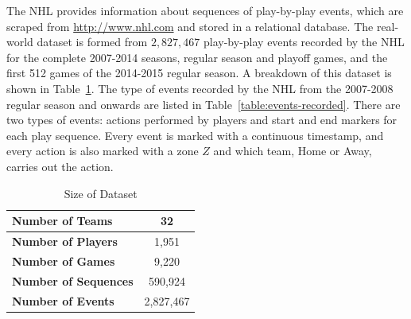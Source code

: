 \documentclass[]{article}
\begin{document}
The NHL provides information about sequences of play-by-play events, which are scraped from \url{http://www.nhl.com} and stored in a relational database. The real-world dataset is formed from $2,827,467$ play-by-play events recorded by the NHL for the complete 2007-2014 seasons, regular season and playoff games, and the first 512 games of the 2014-2015 regular season. A breakdown of this dataset is shown in Table~\ref{table:size-of-dataset}. %
The type of events recorded by the NHL from the 2007-2008 regular season and onwards are listed in Table~\ref{table:events-recorded}. There are two types of events: actions performed by players and start and end markers for each play sequence. Every event is marked with a continuous timestamp, and every action is also marked with a zone $Z$ and which team, Home or Away, carries out the action.%

\begin{table}[htb]
\caption{Size of Dataset}
\label{table:size-of-dataset}
\begin{center}
\begin{tabular}{|l|c|}
\hline
\bf{Number of Teams} & 32 \\ \hline
\bf{Number of Players} & 1,951 \\ \hline
\bf{Number of Games} & 9,220 \\ \hline
\bf{Number of Sequences} & 590,924 \\ \hline
\bf{Number of Events} & 2,827,467 \\ \hline
\end{tabular}
\end{center}
\end{table}
\end{document}
